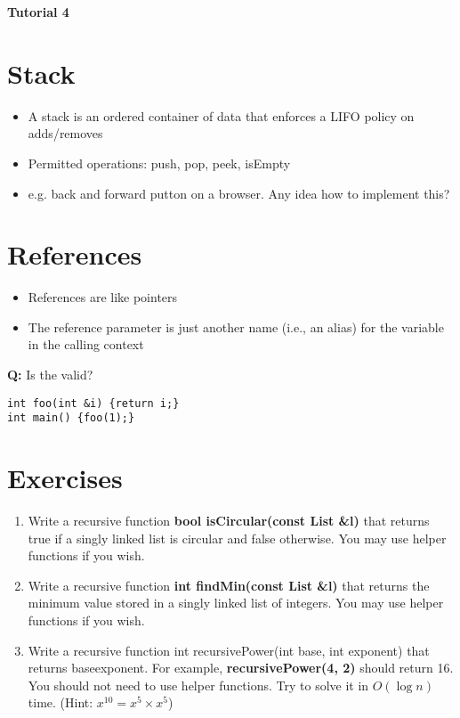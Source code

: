 \documentclass[12pt]{article}
\begin{document}
\begin{center}
    \textbf{\huge Tutorial 4}
\end{center}


\section{Stack}
\begin{itemize}
    \item A stack is an ordered container of data that enforces a LIFO policy on adds/removes
    \item Permitted operations: push, pop, peek, isEmpty
    \item e.g. back and forward putton on a browser. Any idea how to implement this?
\end{itemize}

\begin{center}
\end{center}

\section{References}
\begin{itemize}
    \item References are like pointers
    \item The reference parameter is just another name (i.e., an alias) for the
    variable in the calling context
\end{itemize}
\textbf{Q:} Is the valid?
\begin{verbatim}
int foo(int &i) {return i;}
int main() {foo(1);}
\end{verbatim}

\section{Exercises}
\begin{enumerate}
    \item Write a recursive function \textbf{bool isCircular(const List \&l)} that returns true if a singly linked list 
    is circular and false otherwise. You may use helper functions if you wish.
    \item Write a recursive function \textbf{int findMin(const List \&l)} that returns the minimum value stored in a 
    singly linked list of integers. You may use helper functions if you wish.
    \item Write a recursive function int recursivePower(int base, int exponent) that returns baseexponent. 
    For example, \textbf{recursivePower(4, 2)} should return 16. You should not need to use helper functions. 
    Try to solve it in $O(\log n)$ time. (Hint: $x^{10} = x^5 \times x^5$)
\end{enumerate}
\end{document}
